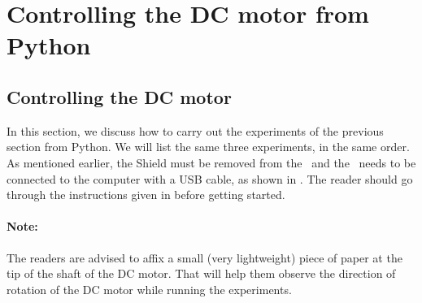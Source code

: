 \section{Controlling the DC motor from Python}
\subsection{Controlling the DC motor}
In this section, we discuss how to carry out the experiments of the
previous section from Python.  We will list the same three experiments,
in the same order. As mentioned earlier, the Shield must be removed from
the \arduino\ and the \arduino\ needs to be connected to the computer
with a USB cable, as shown in . The reader should go through the instructions given in
 before getting started.

\paragraph{Note:} The readers are advised to affix a small
(very lightweight) piece of paper at the tip of the shaft of the DC motor.
That will help them observe the direction of rotation
of the DC motor while running the experiments.

